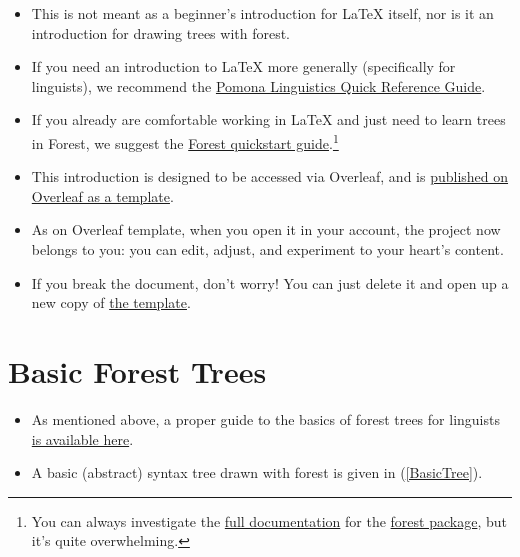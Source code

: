 \documentclass{article}
\begin{document}
\begin{itemize}

\item This is not meant as a beginner's introduction for \LaTeX{} itself, nor is it an introduction for drawing trees with forest. 

\item If you need an introduction to \LaTeX{} more generally (specifically for linguists), we recommend the \href{https://www.overleaf.com/latex/templates/pomona-linguistics-quick-reference-guide/jthrqbrktmrd}{Pomona Linguistics Quick Reference Guide}. 

\item If you already are comfortable working in \LaTeX{} and just need to learn trees in Forest, we suggest the \href{https://ctan.org/pkg/forest-quickstart?lang=en}{Forest quickstart guide}.\footnote{You can always investigate the \href{https://ctan.math.washington.edu/tex-archive/graphics/pgf/contrib/forest/forest-doc.pdf}{full documentation} for the \href{https://ctan.org/pkg/forest?lang=en}{forest package}, but it's quite overwhelming.} 


\item This introduction is designed to be accessed via Overleaf, and is \href{https://www.overleaf.com/latex/templates/arrows-for-syntax-diagrams-with-forest/xjyvcszgcspv}{published on Overleaf as a template}. 

\item As on Overleaf template, when you open it in your account, the project now belongs to you: you can edit, adjust, and experiment to your heart's content.

\item If you break the document, don't worry! You can just delete it and open up a new copy of  \href{https://www.overleaf.com/latex/templates/arrows-for-syntax-diagrams-with-forest/xjyvcszgcspv}{the template}.

\end{itemize}

\section{Basic Forest Trees} \label{SectBasicTrees}

\begin{itemize}

\item As mentioned above, a proper guide to the basics of forest trees for linguists \href{https://ctan.org/pkg/forest-quickstart?lang=en}{is available here}. 

\item A basic (abstract) syntax tree drawn with forest is given in (\ref{BasicTree}). 

\end{itemize}
\end{document}
